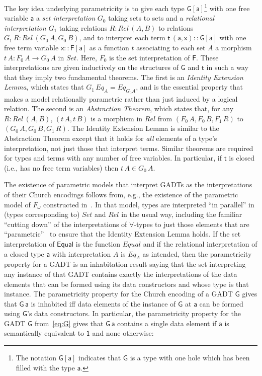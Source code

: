 \documentclass[submission,copyright,creativecommons]{eptcs}
\begin{document}
The key idea underlying parametricity is to give each type
$\mathsf{G[a]}$\footnote{The notation $\mathsf{G[a]}$ indicates that
  $\mathsf{G}$ is a type with one hole which has been filled with the
  type $\mathsf{a}$.}  with one free variable $\mathsf{a}$ a {\em set
  interpretation} $G_0$ taking sets to sets and a \emph{relational
  interpretation} $G_1$ taking relations $R : \mathit{Rel}\,(A,B)$ to
relations $G_1 \,R : \mathit{Rel}\,(G_0 \,A, G_0 \,B)$, and to
interpret each term $\mathsf{t\,(a,x) :: G[a]}$ with one free term
variable $\mathsf{x :: F[a]}$ as a function $t$ associating to each
set $A$ a morphism $t \,A : F_0\,A \to G_0\,A$ in
$\mathit{Set}$. Here, $F_0$ is the set interpretation of $\mathsf{F}$.
These interpretations are given inductively on the structures of
$\mathsf{G}$ and $\mathsf{t}$ in such a way that they imply two
fundamental theorems. The first is an \emph{Identity Extension Lemma},
which states that $G_1\,\mathit{Eq}_A = \mathit{Eq}_{G_0 A}$, and is
the essential property that makes a model relationally parametric
rather than just induced by a logical relation.  The second is an
\emph{Abstraction Theorem}, which states that, for any $R
:\mathit{Rel}\,(A, B)$, $(t\, A, t\,B)$ is a morphism in
$\mathit{Rel}$ from $(F_0\,A,F_0\,B,F_1\,R)$ to
$(G_0\,A,G_0\,B,G_1\,R)$. The Identity Extension Lemma is similar to
the Abstraction Theorem except that it holds for {\em all} elements of
a type's interpretation, not just those that interpret terms.  Similar
theorems are required for types and terms with any number of free
variables. In particular, if $\mathsf{t}$ is closed (i.e., has no free
term variables) then $t\,A \in G_0\,A$.

The existence of parametric models that interpret GADTs as the
interpretations of their Church encodings follows from, e.g., the
existence of the parametric model of $F_\omega$ constructed
in~\cite{atk12}.  In that model, types are interpreted ``in parallel''
in (types corresponding to) $\mathit{Set}$ and $\mathit{Rel}$ in the
usual way, including the familiar ``cutting down'' of the
interpretations of $\forall$-types to just those elements that are
``parametric''~\cite{rey83,wad89} to ensure that the Identity
Extension Lemma holds. If the set interpretation of $\mathsf{Equal}$
is the function $\mathit{Equal}$ and if the relational interpretation
of a closed type $\mathsf{a}$ with interpretation $A$ is
$\mathit{Eq_A}$ as intended, then the parametricity property for a
GADT is an inhabitation result saying that the set interpreting any
instance of that GADT contains exactly the interpretations of the data
elements that can be formed using its data constructors and whose type
is that instance. The parametricity property for the Church encoding
of a GADT $\mathsf{G}$ gives that $\mathsf{G\,a}$ is inhabited iff data
elements of the instance of $\mathsf{G}$ at $\mathsf{a}$ can be formed
using $\mathsf{G}$'s data constructors.  In particular, the
parametricity property for the GADT $\mathsf{G}$ from~\eqref{eq:G}
gives that $\mathsf{G\,a}$ contains a single data element if
$\mathsf{a}$ is semantically equivalent to $\mathsf{1}$ and none
otherwise:
\end{document}

